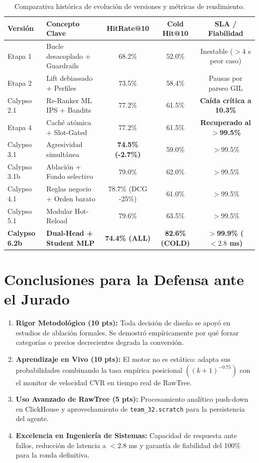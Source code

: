 \documentclass[11pt,a4paper]{article}
\begin{document}
\begin{table}[h!]
\centering
\small
\begin{tabularx}{\textwidth}{lXccc}
\toprule
\textbf{Versión} & \textbf{Concepto Clave} & \textbf{HitRate@10} & \textbf{Cold Hit@10} & \textbf{SLA / Fiabilidad} \\
\midrule
Etapa 1 & Bucle desacoplado + Guardrails & 68.2\% & 52.0\% & Inestable ($>4$ s peor caso) \\
Etapa 2 & Lift debiassado + Perfiles & 73.5\% & 58.4\% & Pausas por parseo GIL \\
Calypso 2.1 & Re-Ranker ML IPS + Bandits & 77.2\% & 61.5\% & \textcolor{secondary}{\textbf{Caída crítica a 10.3\%}} \\
Etapa 4 & Caché atómica + Slot-Gated & 77.2\% & 61.5\% & \textcolor{accent}{\textbf{Recuperado al $>$99.5\%}} \\
Calypso 3.1 & Agresividad simultánea & \textcolor{secondary}{\textbf{74.5\% (-2.7\%)}} & 59.0\% & $>$99.5\% \\
Calypso 3.1b & Ablación + Fondo selectivo & 79.0\% & 62.0\% & $>$99.5\% \\
Calypso 4.1 & Reglas negocio + Orden barato & 78.7\% (DCG -25\%) & 61.0\% & $>$99.5\% \\
Calypso 5.1 & Modular Hot-Reload & 79.6\% & 63.5\% & $>$99.5\% \\
\textbf{Calypso 6.2b} & \textbf{Dual-Head + Student MLP} & \textbf{74.4\% (ALL)} & \textbf{\textcolor{accent}{82.6\% (COLD)}} & \textbf{$>$99.9\% ($< 2.8$ ms)} \\
\bottomrule
\end{tabularx}
\caption{Comparativa histórica de evolución de versiones y métricas de rendimiento.}
\end{table}

\section{Conclusiones para la Defensa ante el Jurado}

\begin{enumerate}
    \item \textbf{Rigor Metodológico (10 pts):} Toda decisión de diseño se apoyó en estudios de ablación formales. Se demostró empíricamente por qué forzar categorías o precios decrecientes degrada la conversión.
    \item \textbf{Aprendizaje en Vivo (10 pts):} El motor no es estático: adapta sus probabilidades combinando la tasa empírica posicional $((k+1)^{-0.75})$ con el monitor de velocidad CVR en tiempo real de RawTree.
    \item \textbf{Uso Avanzado de RawTree (5 pts):} Procesamiento analítico push-down en ClickHouse y aprovechamiento de \texttt{team\_32.scratch} para la persistencia del agente.
    \item \textbf{Excelencia en Ingeniería de Sistemas:} Capacidad de respuesta ante fallos, reducción de latencia a $< 2.8$ ms y garantía de fiabilidad del 100\% para la ronda definitiva.
\end{enumerate}
\end{document}
